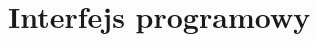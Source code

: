 \documentclass[00-praca-magisterska.tex]{subfiles}
\begin{document}
\chapter{Interfejs programowy}
\label{reference:interfejs-programowy}

\begin{spacing}{1.0}

\end{spacing}
\end{document}
